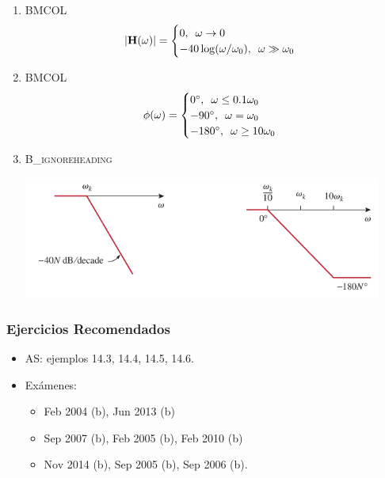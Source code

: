 \begin{enumerate}
\item \hfill{}\textsc{BMCOL}
\label{sec:orgaafc65d}
\[
  |\mathbf{H}(\omega)| = 
  \begin{cases}
  0, \enskip \omega \to 0\\
  - 40 \log (\omega/\omega_0), \enskip \omega \gg \omega_0\\
  \end{cases}
\]

\item \hfill{}\textsc{BMCOL}
\label{sec:org5f23b3a}
\[
  \phi(\omega) = 
  \begin{cases}
    \ang{0},\enskip \omega \leq 0.1\omega_0\\
    - \ang{90}, \enskip \omega = \omega_0\\
    - \ang{180}, \enskip \omega \geq 10 \omega_0
  \end{cases}
\]


\item \hfill{}\textsc{B\_ignoreheading}
\label{sec:org6121336}
\begin{center}
\includegraphics[height=4cm]{../figs/BodePoloCuadratico.pdf}
\end{center}
\end{enumerate}

\subsubsection{Ejercicios Recomendados}
\begin{itemize}
\item AS: ejemplos 14.3, 14.4, 14.5, 14.6.
\item Exámenes:
\begin{itemize}
\item Feb 2004 (b), Jun 2013 (b)
\item Sep 2007 (b), Feb 2005 (b), Feb 2010 (b)
\item Nov 2014 (b), Sep 2005 (b), Sep 2006 (b).
\end{itemize}
\end{itemize}

